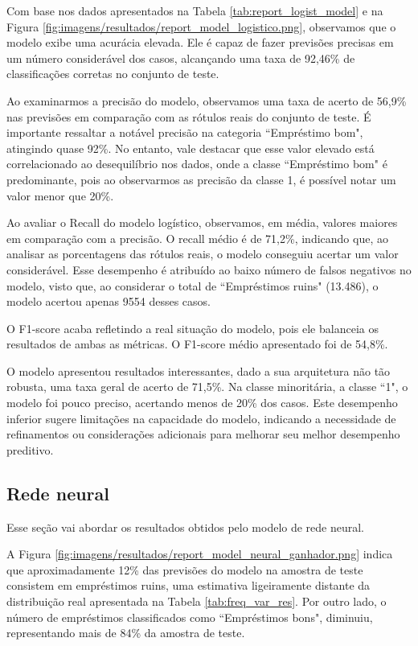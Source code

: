 Com base nos dados apresentados na Tabela \ref{tab:report_logist_model}
e na Figura \ref{fig:imagens/resultados/report_model_logistico.png},
observamos que o modelo exibe uma acurácia elevada. Ele é capaz de fazer 
previsões precisas em um número considerável dos casos, alcançando uma taxa de 92,46\% 
de classificações corretas no conjunto de teste. 

Ao examinarmos a precisão do modelo, observamos uma taxa de acerto de 56,9\%
nas previsões em comparação com as rótulos reais do conjunto de teste. 
É importante ressaltar a notável precisão na categoria ``Empréstimo bom", atingindo quase 92\%. 
No entanto, vale destacar que esse valor elevado está correlacionado ao desequilíbrio nos dados,
onde a classe ``Empréstimo bom" é predominante, pois ao observarmos as precisão da classe 1, é possível notar um
valor menor que 20\%.

Ao avaliar o Recall do modelo logístico, observamos, em média,
valores maiores em comparação com a precisão. O recall médio é de 71,2\%, 
indicando que, ao analisar as porcentagens das rótulos reais, o modelo conseguiu 
acertar um valor considerável. Esse desempenho é atribuído ao baixo número 
de falsos negativos no modelo, visto que, ao considerar o total de ``Empréstimos ruins" (13.486),
 o modelo acertou apenas 9554 desses casos.

O F1-score acaba refletindo a real situação do modelo, pois ele balanceia os resultados
de ambas as métricas. O F1-score médio apresentado foi
de 54,8\%.

O modelo apresentou resultados interessantes, dado a sua arquitetura não tão robusta, uma taxa geral de acerto de 71,5\%.
Na classe minoritária, a classe ``1", o modelo foi pouco preciso, acertando menos de 20\% dos casos.
Este desempenho inferior sugere limitações na capacidade do modelo, indicando a necessidade de refinamentos ou 
considerações adicionais para melhorar seu melhor desempenho preditivo.


\subsection{Rede neural}

Esse seção vai abordar os resultados obtidos pelo modelo de rede neural.




A Figura \ref{fig:imagens/resultados/report_model_neural_ganhador.png} indica que aproximadamente 
12\% das previsões do modelo na amostra de teste consistem em empréstimos ruins, uma estimativa ligeiramente distante 
da distribuição real apresentada na Tabela \ref{tab:freq_var_res}.
Por outro lado, o número de empréstimos
classificados como ``Empréstimos bons", diminuiu, representando mais de 84\% da amostra de teste. 


